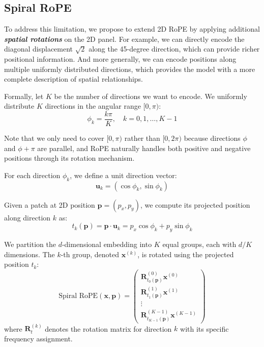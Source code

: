 \subsection{Spiral RoPE}

To address this limitation, we propose to extend 2D RoPE by applying additional \textbf{\textit{spatial rotations}} on the 2D panel. For example, we can directly encode the diagonal displacement $\sqrt{2}$ along the 45-degree direction, which can provide richer positional information. And more generally, we can encode positions along multiple uniformly distributed directions, which provides the model with a more complete description of spatial relationships.

Formally, let $K$ be the number of directions we want to encode. We uniformly distribute $K$ directions in the angular range $[0, \pi)$:
\begin{equation}
    \phi_k = \frac{k \pi}{K}, \quad k = 0, 1, \ldots, K-1
\end{equation}

Note that we only need to cover $[0, \pi)$ rather than $[0, 2\pi)$ because directions $\phi$ and $\phi + \pi$ are parallel, and RoPE naturally handles both positive and negative positions through its rotation mechanism.

For each direction $\phi_k$, we define a unit direction vector:
\begin{equation}
    \mathbf{u}_k = (\cos\phi_k, \sin\phi_k)
\end{equation}

Given a patch at 2D position $\mathbf{p} = (p_x, p_y)$, we compute its projected position along direction $k$ as:
\begin{equation}
    t_k(\mathbf{p}) = \mathbf{p} \cdot \mathbf{u}_k = p_x \cos\phi_k + p_y \sin\phi_k
    \label{eq:projection}
\end{equation}

We partition the $d$-dimensional embedding into $K$ equal groups, each with $d/K$ dimensions. The $k$-th group, denoted $\mathbf{x}^{(k)}$, is rotated using the projected position $t_k$:
\begin{equation}
    \text{Spiral RoPE}(\mathbf{x}, \mathbf{p}) = \begin{pmatrix}
        \mathbf{R}_{t_0(\mathbf{p})}^{(0)} \mathbf{x}^{(0)} \\
        \mathbf{R}_{t_1(\mathbf{p})}^{(1)} \mathbf{x}^{(1)} \\
        \vdots \\
        \mathbf{R}_{t_{K-1}(\mathbf{p})}^{(K-1)} \mathbf{x}^{(K-1)}
    \end{pmatrix}
\end{equation}
where $\mathbf{R}_{t}^{(k)}$ denotes the rotation matrix for direction $k$ with its specific frequency assignment.


